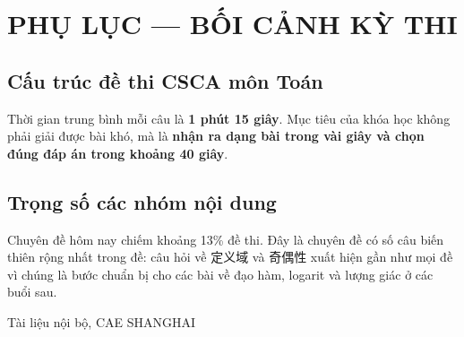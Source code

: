 \documentclass[11pt, a4paper]{article}
\begin{document}
\section{PHỤ LỤC — BỐI CẢNH KỲ THI}

\subsection{Cấu trúc đề thi CSCA môn Toán}


Thời gian trung bình mỗi câu là \textbf{1 phút 15 giây}. Mục tiêu của khóa học không phải giải được bài khó, mà là \textbf{nhận ra dạng bài trong vài giây và chọn đúng đáp án trong khoảng 40 giây}.

\subsection{Trọng số các nhóm nội dung}


Chuyên đề hôm nay chiếm khoảng 13\% đề thi. Đây là chuyên đề có số câu biến thiên rộng nhất trong đề: câu hỏi về 定义域 và 奇偶性 xuất hiện gần như mọi đề vì chúng là bước chuẩn bị cho các bài về đạo hàm, logarit và lượng giác ở các buổi sau.
\vspace{0.8cm}
\begin{center}
{\footnotesize\color{cae_blue} Tài liệu nội bộ, CAE SHANGHAI}
\end{center}
\end{document}
